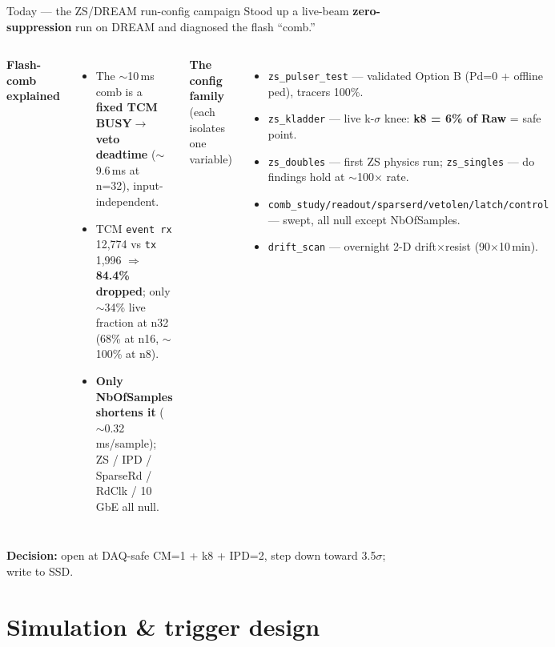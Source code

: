 \documentclass[aspectratio=169,10pt]{beamer}
\newcommand{\hl}[1]{{\color{TealD}\textbf{#1}}}
\begin{document}
\begin{frame}{Today --- the ZS/DREAM run-config campaign}
\small
Stood up a live-beam \hl{zero-suppression} run on DREAM and diagnosed the flash ``comb.''
\begin{columns}[T]
\textbf{\color{TealD}Flash-comb explained}
\begin{itemize}\setlength\itemsep{2pt}
  \item The $\sim$10\,ms comb is a \hl{fixed TCM BUSY$\to$veto deadtime} ($\sim$9.6\,ms at n=32), input-independent.
  \item TCM \texttt{event rx} 12{,}774 vs \texttt{tx} 1{,}996 $\Rightarrow$ \hl{84.4\% dropped}; only $\sim$34\% live fraction at n32 (68\% at n16, $\sim$100\% at n8).
  \item \hl{Only NbOfSamples shortens it} ($\sim$0.32\,ms/sample); ZS / IPD / SparseRd / RdClk / 10\,GbE all null.
\end{itemize}
\textbf{\color{TealD}The config family} (each isolates one variable)
\begin{itemize}\setlength\itemsep{1pt}
  \item \texttt{zs\_pulser\_test} --- validated Option B (Pd=0 + offline ped), tracers 100\%.
  \item \texttt{zs\_kladder} --- live k-$\sigma$ knee: \hl{k8 = 6\% of Raw} = safe point.
  \item \texttt{zs\_doubles} --- first ZS physics run; \texttt{zs\_singles} --- do findings hold at $\sim$100$\times$ rate.
  \item \texttt{comb\_study/readout/sparserd/vetolen/latch/control} --- swept, all null except NbOfSamples.
  \item \texttt{drift\_scan} --- overnight 2-D drift$\times$resist (90$\times$10\,min).
\end{itemize}
\end{columns}
\vspace{2pt}
\textbf{\color{TealD}Decision:} open at DAQ-safe CM=1 + k8 + IPD=2, step down toward 3.5$\sigma$; write to SSD.
\end{frame}

\section{Simulation \& trigger design}
\end{document}
